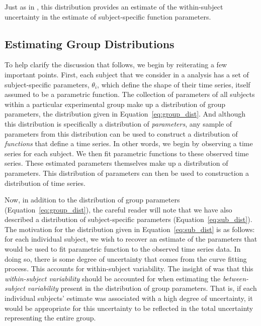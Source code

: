 Just as in \citet{oleson2017detecting}, this distribution provides an estimate of the within-subject uncertainty in the estimate of subject-specific function parameters.




\subsection{Estimating Group Distributions}\label{sec:group_dist}

To help clarify the discussion that follows, we begin by reiterating a few important points. First, each subject that we consider in a  analysis has a set of subject-specific parameters, $\theta_i$, which define the shape of their time series, itself assumed to be a parametric function. The collection of parameters of all subjects within a particular experimental group make up a distribution of group parameters, the distribution given in Equation~\ref{eq:group_dist}. And although this distribution is specifically a distribution of \textit{parameters}, any sample of parameters from this distribution can be used to  construct a distribution of \textit{functions} that define a time series. In other words, we begin by observing a time series for each subject. We then fit parametric functions to these observed time series. These estimated parameters themselves make up a distribution of parameters. This distribution of parameters can then be used to construction a distribution of time series. 

Now, in addition to the distribution of group parameters (Equation~\ref{eq:group_dist}), the careful reader will note that we have also described a distribution of subject-specific parameters (Equation~\ref{eq:sub_dist}). The motivation for the distribution given in Equation~\ref{eq:sub_dist} is as follows: for each individual subject, we wish to recover an estimate of the parameters that would be used to fit parametric function to the observed time series data. In doing so, there is some degree of uncertainty that comes from the curve fitting process. This accounts for within-subject variability. The insight of \citet{oleson2017detecting} was that this \textit{within-subject variability} should be accounted for when estimating the \textit{between-subject variability} present in the distribution of group parameters. That is, if each individual subjects' estimate was associated with a high degree of uncertainty, it would be appropriate for this uncertainty to be reflected in the total uncertainty representing the entire group.

